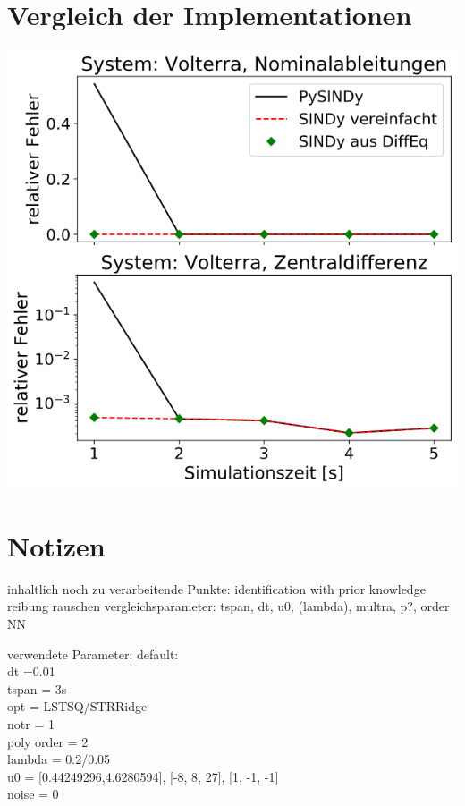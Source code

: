 \documentclass[arbeit=studie,oneside,BCOR=12mm]{ArbeitRST}
\begin{document}
\chapter{Vergleich der Implementationen}

\includegraphics[width=1\textwidth]{images/errors_volterra_tspan_variation.png}









\chapter{Notizen}
inhaltlich noch zu verarbeitende Punkte: 
identification with prior knowledge
reibung
rauschen
vergleichsparameter: tspan, dt, u0, (lambda), multra, p?, order
NN

verwendete Parameter:
default: \\
dt =0.01\\
tspan = 3s\\
opt = LSTSQ/STRRidge\\
notr = 1\\
poly order = 2\\
lambda = 0.2/0.05\\
u0 = [0.44249296,4.6280594], [-8, 8, 27], [1, -1, -1]\\
noise = 0\\
\end{document}
